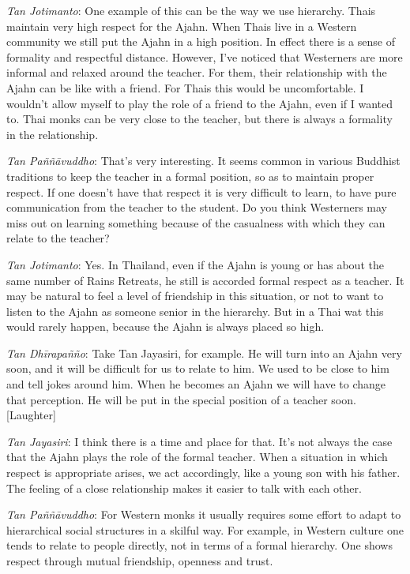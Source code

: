 \emph{Tan Jotimanto}: One example of this can be the way we use
hierarchy. Thais maintain very high respect for the Ajahn. When Thais
live in a Western community we still put the Ajahn in a high position. 
In effect there is a sense of formality and respectful distance. 
However, I've noticed that Westerners are more informal and relaxed
around the teacher. For them, their relationship with the Ajahn can be
like with a friend. For Thais this would be uncomfortable. I wouldn't
allow myself to play the role of a friend to the Ajahn, even if I wanted
to. Thai monks can be very close to the teacher, but there is always a
formality in the relationship. 

\emph{Tan Paññāvuddho}: That's very interesting. It seems common in
various Buddhist traditions to keep the teacher in a formal position, so
as to maintain proper respect. If one doesn't have that respect it is
very difficult to learn, to have pure communication from the teacher to
the student. Do you think Westerners may miss out on learning something
because of the casualness with which they can relate to the teacher? 

\emph{Tan Jotimanto}: Yes. In Thailand, even if the Ajahn is young or
has about the same number of Rains Retreats, he still is accorded formal
respect as a teacher. It may be natural to feel a level of friendship in
this situation, or not to want to listen to the Ajahn as someone senior
in the hierarchy. But in a Thai wat this would rarely happen, because
the Ajahn is always placed so high. 

\emph{Tan Dhīrapañño}: Take Tan Jayasiri, for example. He will turn
into an Ajahn very soon, and it will be difficult for us to relate to
him. We used to be close to him and tell jokes around him. When he
becomes an Ajahn we will have to change that perception. He will be put
in the special position of a teacher soon. [Laughter]

\emph{Tan Jayasiri}: I think there is a time and place for that. It's
not always the case that the Ajahn plays the role of the formal teacher. 
When a situation in which respect is appropriate arises, we act
accordingly, like a young son with his father. The feeling of a close
relationship makes it easier to talk with each other. 

\emph{Tan Paññāvuddho}: For Western monks it usually requires some
effort to adapt to hierarchical social structures in a skilful way. For
example, in Western culture one tends to relate to people directly, not
in terms of a formal hierarchy. One shows respect through mutual
friendship, openness and trust.

